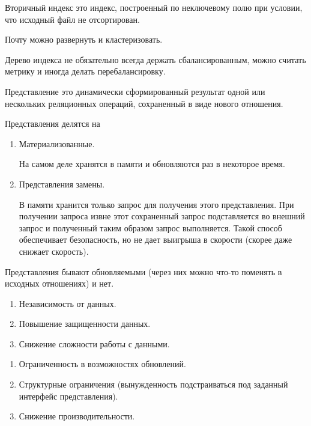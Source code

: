 \begin{definition}
  Вторичный индекс это индекс, построенный по неключевому полю при условии,
  что исходный файл не отсортирован.
\end{definition}

\begin{example}
  Почту можно развернуть и кластеризовать.
\end{example}

\begin{remark}
  Дерево индекса не обязательно всегда держать сбалансированным, можно считать
  метрику  и иногда делать перебалансировку.
\end{remark}


\begin{definition}
  Представление это динамически сформированный результат одной или нескольких
  реляционных операций, сохраненный в виде нового отношения.
\end{definition}

Представления делятся на

\begin{enumerate}
\item
  Материализованные.

  На самом деле хранятся в памяти и обновляются раз в некоторое время.

\item
  Представления замены.

  В памяти хранится только запрос для получения этого представления. При
  получении запроса извне этот сохраненный запрос подставляется во внешний
  запрос и полученный таким образом запрос выполняется. Такой способ
  обеспечивает безопасность, но не дает выигрыша в скорости (скорее даже снижает
  скорость).
\end{enumerate}

Представления бывают обновляемыми (через них можно что-то поменять в исходных
отношениях) и нет.


\begin{enumerate}
\item
  Независимость от данных.

\item
  Повышение защищенности данных.

\item
  Снижение сложности работы с данными.
\end{enumerate}


\begin{enumerate}
\item
  Ограниченность в возможностях обновлений.

\item
  Структурные ограничения (вынужденность подстраиваться под заданный интерфейс
  представления).

\item
  Снижение производительности.
\end{enumerate}

